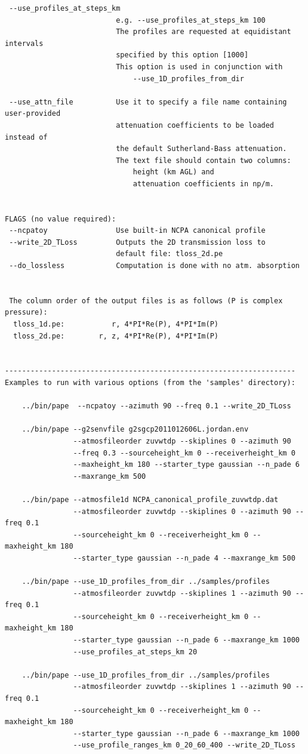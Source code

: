 \begin{verbatim}
 --use_profiles_at_steps_km
                          e.g. --use_profiles_at_steps_km 100
                          The profiles are requested at equidistant intervals 
                          specified by this option [1000]
                          This option is used in conjunction with
                              --use_1D_profiles_from_dir

 --use_attn_file          Use it to specify a file name containing user-provided
                          attenuation coefficients to be loaded instead of 
                          the default Sutherland-Bass attenuation. 
                          The text file should contain two columns: 
                              height (km AGL) and 
                              attenuation coefficients in np/m.


FLAGS (no value required):
 --ncpatoy                Use built-in NCPA canonical profile
 --write_2D_TLoss         Outputs the 2D transmission loss to
                          default file: tloss_2d.pe
 --do_lossless            Computation is done with no atm. absorption


 The column order of the output files is as follows (P is complex pressure):
  tloss_1d.pe:           r, 4*PI*Re(P), 4*PI*Im(P)
  tloss_2d.pe:        r, z, 4*PI*Re(P), 4*PI*Im(P)


--------------------------------------------------------------------
Examples to run with various options (from the 'samples' directory):

    ../bin/pape  --ncpatoy --azimuth 90 --freq 0.1 --write_2D_TLoss

    ../bin/pape --g2senvfile g2sgcp2011012606L.jordan.env 
                --atmosfileorder zuvwtdp --skiplines 0 --azimuth 90 
                --freq 0.3 --sourceheight_km 0 --receiverheight_km 0 
                --maxheight_km 180 --starter_type gaussian --n_pade 6 
                --maxrange_km 500

    ../bin/pape --atmosfile1d NCPA_canonical_profile_zuvwtdp.dat 
                --atmosfileorder zuvwtdp --skiplines 0 --azimuth 90 --freq 0.1 
                --sourceheight_km 0 --receiverheight_km 0 --maxheight_km 180 
                --starter_type gaussian --n_pade 4 --maxrange_km 500

    ../bin/pape --use_1D_profiles_from_dir ../samples/profiles 
                --atmosfileorder zuvwtdp --skiplines 1 --azimuth 90 --freq 0.1 
                --sourceheight_km 0 --receiverheight_km 0 --maxheight_km 180
                --starter_type gaussian --n_pade 6 --maxrange_km 1000  
                --use_profiles_at_steps_km 20

    ../bin/pape --use_1D_profiles_from_dir ../samples/profiles 
                --atmosfileorder zuvwtdp --skiplines 1 --azimuth 90 --freq 0.1 
                --sourceheight_km 0 --receiverheight_km 0 --maxheight_km 180 
                --starter_type gaussian --n_pade 6 --maxrange_km 1000  
                --use_profile_ranges_km 0_20_60_400 --write_2D_TLoss
\end{verbatim}

